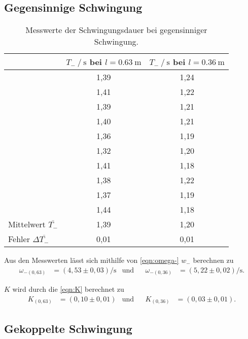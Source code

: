 \subsection{Gegensinnige Schwingung}
\label{subsec:aus_gegen}
\begin{table}[H]
  \centering
  \caption{Messwerte der Schwingungsdauer bei gegensinniger Schwingung.}
  \label{tab:T-}
  \begin{tabular}{l S S}
    \toprule
     & {$T_- \mathbin{/} \si{\second}$ bei $l=\qty{0.63}{\meter}$} & {$T_- \mathbin{/} \si{\second}$ bei $l=\qty{0.36}{\meter}$}\\
    \midrule
      &1,39 & 1,24\\
      &1,41 & 1,22\\
      &1,39 & 1,21\\
      &1,40 & 1,21\\
      &1,36 & 1,19\\
      &1,32 & 1,20\\
      &1,41 & 1,18\\
      &1,38 & 1,22\\
      &1,37 & 1,19\\
      &1,44 & 1,18\\
    \midrule
      Mittelwert $\overline{T_-}$& 1,39 & 1,20\\
      Fehler $\Delta \overline{T_-}$& 0,01 & 0,01\\
    \bottomrule
  \end{tabular}
\end{table}

Aus den Messwerten lässt sich mithilfe von \autoref{eqn:omega-} $w_-$ berechnen zu 
\begin{align*}
  \omega_{-(0,63)}&=(4,53 \pm 0,03) \si{\per\second} & \text{und} && \omega_{-(0,36)}&=(5,22 \pm 0,02) \si{\per\second}.
\end{align*}

$K$ wird durch die \autoref{eqn:K} berechnet zu
\begin{align*}
  K_{(0,63)}&=(0,10 \pm 0,01) & \text{und} && K_{(0,36)}&=(0,03 \pm 0,01).
\end{align*} 

\subsection{Gekoppelte Schwingung}
\label{subsec:aus_gekoppelt}

